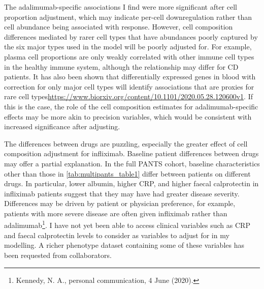 \begin{outline}
The adalimumab-specific associations I find were more significant after cell proportion adjustment, 
which may indicate per-cell downregulation rather than cell abundance being associated with response.
However, cell composition differences mediated by rarer cell types that have abundances poorly captured by the six major types used in the model will be poorly adjusted for.
For example, plasma cell proportions are only weakly correlated with other immune cell types in the healthy immune system\autocite{zalocusky201810000Immunomes}, 
although the relationship may differ for \gls{CD} patients.
It has also been shown that differentially expressed genes in blood with correction for only major cell types will 
identify associations that are proxies for rare cell types\url{https://www.biorxiv.org/content/10.1101/2020.05.28.120600v1}.
If this is the case, the role of the cell composition estimates for adalimumab-specific effects may be more akin to precision variables, 
which would be consistent with increased significance after adjusting.

The differences between drugs are puzzling, especially the greater effect of cell composition adjustment for infliximab. 
Baseline patient differences between drugs may offer a partial explanation.
In the full \gls{PANTS} cohort, baseline characteristics other than those in \autoref{tab:multipants_table1} differ between patients on different drugs\autocite{kennedy2019PredictorsAntiTNFTreatment}.
In particular, lower albumin, higher \gls{CRP}, and higher faecal calprotectin in infliximab patients suggest that they may have had greater disease severity.
Differences may be driven by patient or physician preference, for example, patients with more severe disease are often given infliximab rather than adalimumab\footnote{Kennedy, N. A., personal communication, 4 June (2020).}.
I have not yet been able to access clinical variables such as \gls{CRP} and faecal calprotectin levels to consider as variables to adjust for in my modelling.
A richer phenotype dataset containing some of these variables has been requested from collaborators.


\end{outline}
